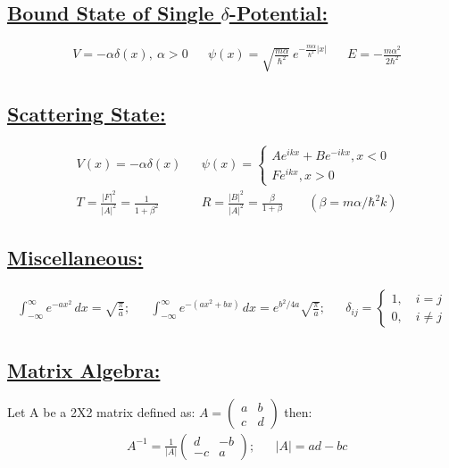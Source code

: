 \documentclass[a4paper,12pt]{article}
\begin{document}
\subsection*{\underline{Bound State of Single $\delta$-Potential:}}
\begin{align}
    &V=-\alpha\delta(x), \ \alpha>0
    &
    &\psi(x)=\sqrt{\frac{m\alpha}{\hbar^2}}\ e^{-\frac{m\alpha}{\hbar^2}|x|}
    &
    &E=-\frac{m\alpha^2}{2\hbar^2}
\end{align}
\subsection*{\underline{Scattering State:}}
\begin{align}
    &V(x)=-\alpha\delta(x)
    &
    &\psi(x)=\left\{\begin{matrix}Ae^{ikx}+Be^{-ikx}, x<0\\Fe^{ikx}, x>0\end{matrix}\right.
    \\
    &T=\frac{|F|^2}{|A|^2}=\frac{1}{1+\beta^2}
    &
    &R=\frac{|B|^2}{|A|^2}=\frac{\beta}{1+\beta}\qquad (\beta=m\alpha/\hbar^2k)
\end{align}
\subsection*{\underline{Miscellaneous:}}
\begin{align}
    \int_{-\infty}^\infty e^{-ax^2}\, dx=\sqrt{\frac{\pi}{a}};
    &&
    \int_{-\infty}^\infty e^{-(ax^2+bx)}\,dx=e^{b^2/4a}\sqrt{\frac{\pi}{a}};
    &&
    \delta_{ij}=\left\{
        \begin{matrix}
            1,\quad i=j\\
            0,\quad i\neq j
        \end{matrix}
    \right.
\end{align}
\subsection*{\underline{Matrix Algebra:}}
Let A be a 2X2 matrix defined as:
     $A=\left(
        \begin{matrix}
            a     &b\\
            c     &d
        \end{matrix}
    \right)$ then:
\begin{align}
    &A^{-1}=\frac{1}{|A|}\left(
        \begin{matrix}
            d     &-b\\
            -c     &a
        \end{matrix}
    \right);
    &&|A| = ad-bc
\end{align}
\end{document}
